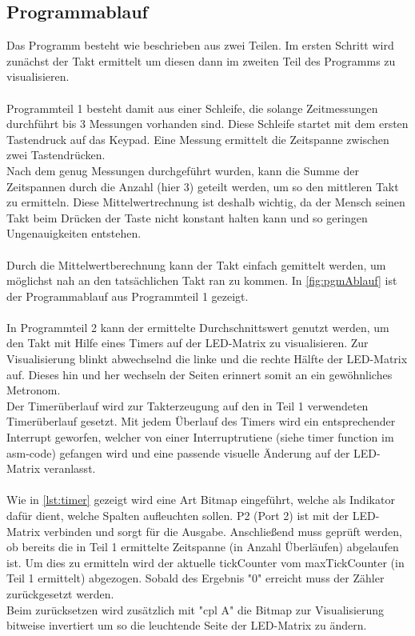 \documentclass[a4paper, 12pt]{scrartcl}
\begin{document}
\subsection{Programmablauf}
Das Programm besteht wie beschrieben aus zwei Teilen. Im ersten Schritt wird zunächst der Takt ermittelt um diesen dann im zweiten Teil des Programms zu visualisieren.
\\
\\
Programmteil 1 besteht damit aus einer Schleife, die solange Zeitmessungen durchführt bis 3 Messungen vorhanden sind. Diese Schleife startet mit dem ersten Tastendruck auf das Keypad. Eine Messung ermittelt die Zeitspanne zwischen zwei Tastendrücken. 
\\
Nach dem genug Messungen durchgeführt wurden, kann die Summe der Zeitspannen durch die Anzahl (hier 3) geteilt werden, um so den mittleren Takt zu ermitteln. Diese Mittelwertrechnung ist deshalb wichtig, da der Mensch seinen Takt beim Drücken der Taste nicht konstant halten kann und so geringen Ungenauigkeiten entstehen.
\\
\\
Durch die Mittelwertberechnung kann der Takt einfach gemittelt werden, um möglichst nah an den tatsächlichen Takt ran zu kommen. In \autoref{fig:pgmAblauf} ist der Programmablauf aus Programmteil 1 gezeigt.
\\
\\

In Programmteil 2 kann der ermittelte Durchschnittswert genutzt werden, um den Takt mit Hilfe eines Timers auf der LED-Matrix zu visualisieren. Zur Visualisierung blinkt abwechselnd die linke und die rechte Hälfte der LED-Matrix auf. Dieses hin und her wechseln der Seiten erinnert somit an ein gewöhnliches Metronom.
\\  
Der Timerüberlauf wird zur Takterzeugung auf den in Teil 1 verwendeten Timerüberlauf gesetzt. Mit jedem Überlauf des Timers wird ein entsprechender Interrupt geworfen, welcher von einer Interruptrutiene (siehe timer function im asm-code) gefangen wird und eine passende visuelle Änderung auf der LED-Matrix veranlasst.
\\
\\
Wie in \autoref{lst:timer} gezeigt wird eine Art Bitmap eingeführt, welche als Indikator dafür dient, welche Spalten aufleuchten sollen. P2 (Port 2) ist mit der LED-Matrix verbinden und sorgt für die Ausgabe. Anschließend muss geprüft werden, ob bereits die in Teil 1 ermittelte Zeitspanne (in Anzahl Überläufen) abgelaufen ist. Um dies zu ermitteln wird der aktuelle tickCounter vom maxTickCounter (in Teil 1 ermittelt) abgezogen. Sobald des Ergebnis "0" erreicht muss der Zähler zurückgesetzt werden.
\\
Beim zurücksetzen wird zusätzlich mit "cpl A" die Bitmap zur Visualisierung bitweise invertiert um so die leuchtende Seite der LED-Matrix zu ändern.
\end{document}
